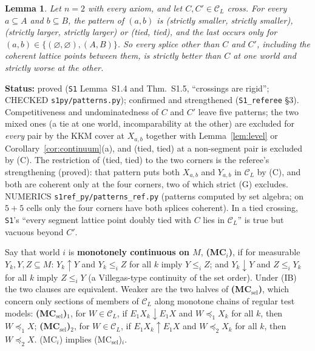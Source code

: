 \documentclass[11pt]{article}
\newtheorem{lemma}[theorem]{Lemma}
\theoremstyle{definition}
\theoremstyle{remark}
\newcommand{\C}{\mathcal C}
\newcommand{\src}[1]{\texttt{#1}}
\newcommand{\status}[1]{\par\smallskip\noindent\textbf{Status:} #1\par\smallskip}
\begin{document}
\begin{lemma}\label{lem:rigid}
Let $n=2$ with every axiom, and let $C,C'\in\C_L$ cross. For every $a\subseteq A$ and $b\subseteq B$, the pattern of $(a,b)$ is (strictly smaller, strictly smaller), (strictly larger, strictly larger) or (tied, tied), and the last occurs only for $(a,b)\in\{(\varnothing,\varnothing),(A,B)\}$. So every splice other than $C$ and $C'$, including the coherent lattice points between them, is strictly better than $C$ at one world and strictly worse at the other.
\end{lemma}
\status{proved (\src{S1} Lemma~S1.4 and Thm.~S1.5, ``crossings are rigid''; CHECKED \src{s1py/patterns.py}); confirmed and strengthened (\src{S1\_referee} \S3). Competitiveness and undominatedness of $C$ and $C'$ leave five patterns; the two mixed ones (a tie at one world, incomparability at the other) are excluded for \emph{every} pair by the KKM cover at $X_{a,b}$ together with Lemma~\ref{lem:level} or Corollary~\ref{cor:continuum}(a), and (tied, tied) at a non-segment pair is excluded by (C). The restriction of (tied, tied) to the two corners is the referee's strengthening (proved): that pattern puts both $X_{a,b}$ and $Y_{a,b}$ in $\C_L$ by (C), and both are coherent only at the four corners, two of which strict (G) excludes. NUMERICS \src{s1ref\_py/patterns\_ref.py} (patterns computed by set algebra; on $5+5$ cells only the four corners have both splices coherent). In a tied crossing, \src{S1}'s ``every segment lattice point doubly tied with $C$ lies in $\C_L$'' is true but vacuous beyond $C'$.}

Say that world $i$ is \textbf{monotonely continuous on $M$}, \textbf{(MC$_i$)}, if for measurable $Y_k,Y,Z\subseteq M$: $Y_k\uparrow Y$ and $Y_k\le_iZ$ for all $k$ imply $Y\le_iZ$; and $Y_k\downarrow Y$ and $Z\le_iY_k$ for all $k$ imply $Z\le_iY$ (a Villegas-type continuity of the set order). Under (IB) the two clauses are equivalent. Weaker are the two halves of \textbf{(MC$_{\mathrm{sel}}$)}, which concern only sections of members of $\C_L$ along monotone chains of regular test models: \textbf{(MC$_{\mathrm{sel}}$)$_1$}, for $W\in\C_L$, if $E_1X_k\downarrow E_1X$ and $W\preceq_1X_k$ for all $k$, then $W\preceq_1X$; \textbf{(MC$_{\mathrm{sel}}$)$_2$}, for $W\in\C_L$, if $E_1X_k\uparrow E_1X$ and $W\preceq_2X_k$ for all $k$, then $W\preceq_2X$. (MC$_i$) implies (MC$_{\mathrm{sel}}$)$_i$.
\end{document}
